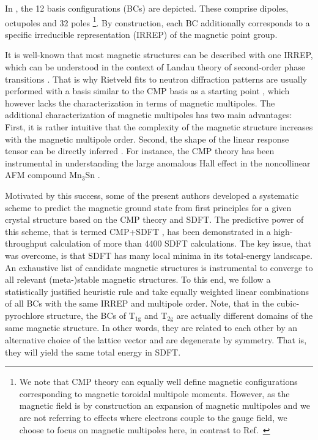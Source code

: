 \documentclass[10pt]{iopart}
\begin{document}
In , the 12 basis configurations (BCs) are depicted. These comprise dipoles, octupoles and 32 poles \footnote{We note that CMP theory can equally well define magnetic configurations corresponding to magnetic toroidal multipole moments. However, as the magnetic field is by construction an expansion of magnetic multipoles and we are not referring to effects where electrons couple to the gauge field, we choose to focus on magnetic multipoles here, in contrast to Ref.\ \cite{suzuki2019multipole}}. By construction, each BC additionally corresponds to a specific irreducible representation (IRREP) of the magnetic point group. 

It is well-known that most magnetic structures can be described with one IRREP, which can be understood in the context of Landau theory of second-order phase transitions \cite{landau2013course}. That is why Rietveld fits \cite{rietveld1969profile} to neutron diffraction patterns are usually performed with a basis similar to the CMP basis as a starting point \cite{hovestreydt1992karep,wills2000new,sikora2004mody,stokes2006isodisplace,aroyo2011crystallography,wills2015indexing}, which however lacks the characterization in terms of magnetic multipoles. The additional characterization of magnetic multipoles has two main advantages: First, it is rather intuitive that the complexity of the magnetic structure increases with the magnetic multipole order. Second, the shape of the linear response tensor can be directly inferred \cite{hayami2018classification}. For instance, the CMP theory has been instrumental in understanding the large anomalous Hall effect in the noncollinear AFM compound Mn$_3$Sn \cite{suzuki2017cluster,hayami2021essential}. 

Motivated by this success, some of the present authors developed a systematic scheme \cite{huebsch2021benchmark} to predict the magnetic ground state from first principles for a given crystal structure based on the CMP theory and SDFT. The predictive power of this scheme, that is termed CMP+SDFT \cite{huebsch2021benchmark}, has been demonstrated in a high-throughput calculation of more than 4400 SDFT calculations. 
The key issue, that was overcome, is that SDFT has many local minima in its total-energy landscape. An exhaustive list of candidate magnetic structures is instrumental to converge to all relevant (meta-)stable magnetic structures. To this end, we follow a statistically justified heuristic rule and take equally weighted linear combinations of all BCs with the same IRREP and multipole order. 
Note, that in the cubic-pyrochlore structure, the BCs of T$_{1\mathrm{g}}$ and T$_{2\mathrm{g}}$ are actually different domains of the same magnetic structure. In other words, they are related to each other by an alternative choice of the lattice vector and are degenerate by symmetry. That is, they will yield the same total energy in SDFT. 
\end{document}
